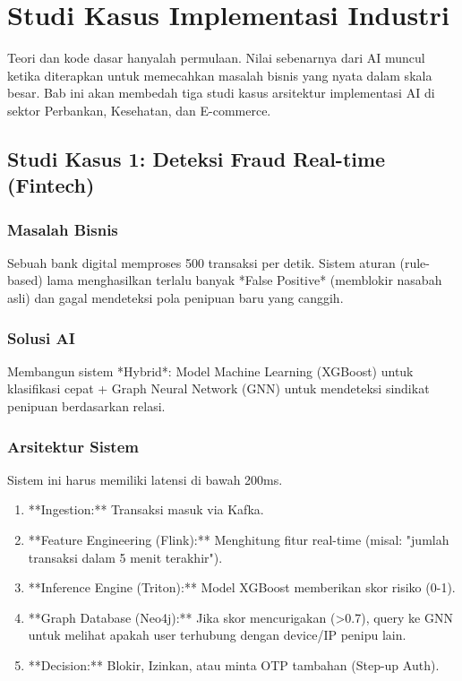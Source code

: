 \chapter{Studi Kasus Implementasi Industri}
\label{chap:case_studies}

Teori dan kode dasar hanyalah permulaan. Nilai sebenarnya dari AI muncul ketika diterapkan untuk memecahkan masalah bisnis yang nyata dalam skala besar. Bab ini akan membedah tiga studi kasus arsitektur implementasi AI di sektor Perbankan, Kesehatan, dan E-commerce.

\section{Studi Kasus 1: Deteksi Fraud Real-time (Fintech)}

\subsection{Masalah Bisnis}
Sebuah bank digital memproses 500 transaksi per detik. Sistem aturan (rule-based) lama menghasilkan terlalu banyak *False Positive* (memblokir nasabah asli) dan gagal mendeteksi pola penipuan baru yang canggih.

\subsection{Solusi AI}
Membangun sistem *Hybrid*: Model Machine Learning (XGBoost) untuk klasifikasi cepat + Graph Neural Network (GNN) untuk mendeteksi sindikat penipuan berdasarkan relasi.

\subsection{Arsitektur Sistem}
Sistem ini harus memiliki latensi di bawah 200ms.
\begin{enumerate}
    \item **Ingestion:** Transaksi masuk via Kafka.
    \item **Feature Engineering (Flink):** Menghitung fitur real-time (misal: "jumlah transaksi dalam 5 menit terakhir").
    \item **Inference Engine (Triton):** Model XGBoost memberikan skor risiko (0-1).
    \item **Graph Database (Neo4j):** Jika skor mencurigakan (>0.7), query ke GNN untuk melihat apakah user terhubung dengan device/IP penipu lain.
    \item **Decision:** Blokir, Izinkan, atau minta OTP tambahan (Step-up Auth).
\end{enumerate}

